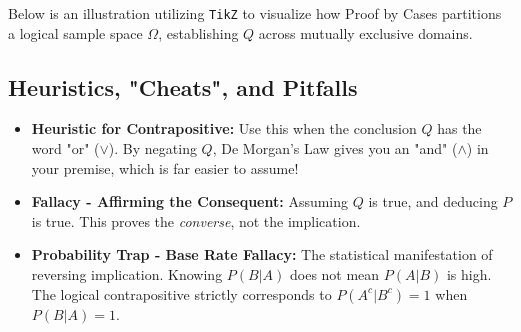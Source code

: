 \documentclass[11pt]{article}
\begin{document}
Below is an illustration utilizing \texttt{TikZ} to visualize how Proof by Cases partitions a logical sample space $\Omega$, establishing $Q$ across mutually exclusive domains.

\vspace{0.5cm}
\begin{center}
\end{center}

\subsection{Heuristics, "Cheats", and Pitfalls}
\begin{itemize}
    \item \textbf{Heuristic for Contrapositive:} Use this when the conclusion $Q$ has the word "or" ($\lor$). By negating $Q$, De Morgan's Law gives you an "and" ($\land$) in your premise, which is far easier to assume!
    \item \textbf{Fallacy - Affirming the Consequent:} Assuming $Q$ is true, and deducing $P$ is true. This proves the \textit{converse}, not the implication. 
    \item \textbf{Probability Trap - Base Rate Fallacy:} The statistical manifestation of reversing implication. Knowing $P(B|A)$ does not mean $P(A|B)$ is high. The logical contrapositive strictly corresponds to $P(A^c | B^c) = 1$ when $P(B|A) = 1$.
\end{itemize}
\end{document}
